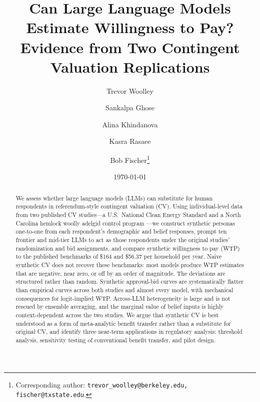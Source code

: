 \documentclass[12pt]{article}
\title{Can Large Language Models Estimate Willingness to Pay? \\ Evidence from Two Contingent Valuation Replications}
\date{\today}
\author[1]{Trevor Woolley}
\author[2, 5]{Sankalpa Ghose}
\author[3]{Alina Khindanova}
\author[4, 5]{Kasra Rasaee}
\author[6]{Bob Fischer\thanks{Corresponding author: \texttt{trevor\_woolley@berkeley.edu, fischer@txstate.edu}.}}
\affil[1]{\textit{University of California, Berkeley}}
\affil[2]{\textit{National University of Singapore}}
\affil[3]{\textit{University of Texas at San Antonio}}
\affil[4]{\textit{Bloomberg}}
\affil[5]{\textit{Alethic Research}}
\affil[6]{\textit{Texas State University}}
\begin{document}

\maketitle


\footnotesize
\begin{abstract}
We assess whether large language models (LLMs) can substitute for human
respondents in referendum-style contingent valuation (CV). Using
individual-level data from two published CV studies---a U.S.\ National
Clean Energy Standard \parencite{Aldy2012} and a North Carolina hemlock
woolly adelgid control program \parencite{Giguere2020}---we construct
synthetic personas one-to-one from each respondent's demographic and
belief responses, prompt ten frontier and mid-tier LLMs to act as those
respondents under the original studies' randomization and bid
assignments, and compare synthetic willingness to pay (WTP) to the
published benchmarks of \$164 and \$56.37 per household per year. Naive
synthetic CV does not recover these benchmarks: most models produce WTP
estimates that are negative, near zero, or off by an order of magnitude.
The deviations are structured rather than random. Synthetic approval-bid
curves are systematically flatter than empirical curves across both
studies and almost every model, with mechanical consequences for
logit-implied WTP. Across-LLM heterogeneity is large and is not rescued
by ensemble averaging, and the marginal value of belief inputs is
highly context-dependent across the two studies. We argue that synthetic
CV is best understood as a form of meta-analytic benefit transfer rather
than a substitute for original CV, and identify three near-term
applications in regulatory analysis: threshold analysis, sensitivity
testing of conventional benefit transfer, and pilot design.
\end{abstract}

\newpage

%
\end{document}
